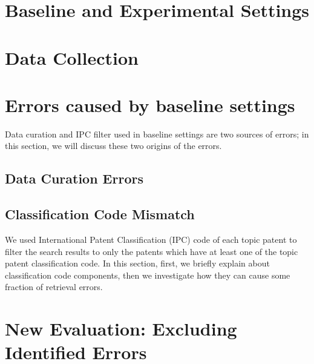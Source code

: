 \section{Baseline and Experimental Settings}
\label{sec:settings}

\section{Data Collection}
\label{sec:DataCollection}

\section{Errors caused by baseline settings}
Data curation and IPC filter used in baseline settings are two sources of errors;
in this section, we will discuss these two origins of the errors.

\subsection{Data Curation Errors}
\label{sec:DataCurationErrors}

\subsection{Classification Code Mismatch}
We used International Patent Classification (IPC) code of each topic patent to filter the search results to only the patents which have at least one of the topic patent classification code. In this section, first, we briefly explain about classification code components, then we investigate how they can cause some fraction of retrieval errors.
\label{sec:ClassificationCodeMismatch}

\section{New Evaluation: Excluding Identified Errors}


